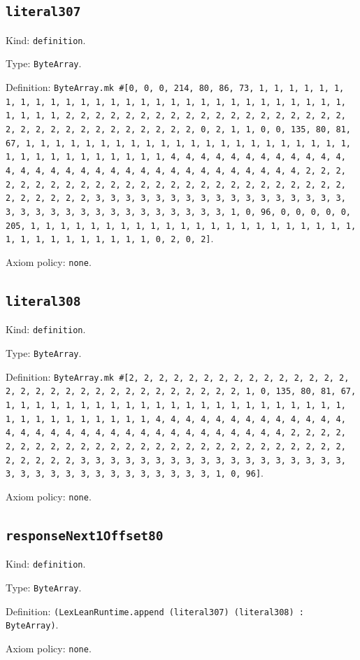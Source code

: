 \documentclass[11pt]{article}
\begin{document}
\subsection*{\texttt{literal307}}
\noindent Kind: \texttt{definition}.\par
\noindent Type: \texttt{ByteArray}.\par
\noindent Definition: \texttt{ByteArray.mk \#[0, 0, 0, 214, 80, 86, 73, 1, 1, 1, 1, 1, 1, 1, 1, 1, 1, 1, 1, 1, 1, 1, 1, 1, 1, 1, 1, 1, 1, 1, 1, 1, 1, 1, 1, 1, 1, 1, 1, 1, 2, 2, 2, 2, 2, 2, 2, 2, 2, 2, 2, 2, 2, 2, 2, 2, 2, 2, 2, 2, 2, 2, 2, 2, 2, 2, 2, 2, 2, 2, 2, 2, 0, 2, 1, 1, 0, 0, 135, 80, 81, 67, 1, 1, 1, 1, 1, 1, 1, 1, 1, 1, 1, 1, 1, 1, 1, 1, 1, 1, 1, 1, 1, 1, 1, 1, 1, 1, 1, 1, 1, 1, 1, 1, 1, 4, 4, 4, 4, 4, 4, 4, 4, 4, 4, 4, 4, 4, 4, 4, 4, 4, 4, 4, 4, 4, 4, 4, 4, 4, 4, 4, 4, 4, 4, 4, 4, 2, 2, 2, 2, 2, 2, 2, 2, 2, 2, 2, 2, 2, 2, 2, 2, 2, 2, 2, 2, 2, 2, 2, 2, 2, 2, 2, 2, 2, 2, 2, 2, 3, 3, 3, 3, 3, 3, 3, 3, 3, 3, 3, 3, 3, 3, 3, 3, 3, 3, 3, 3, 3, 3, 3, 3, 3, 3, 3, 3, 3, 3, 3, 3, 1, 0, 96, 0, 0, 0, 0, 0, 205, 1, 1, 1, 1, 1, 1, 1, 1, 1, 1, 1, 1, 1, 1, 1, 1, 1, 1, 1, 1, 1, 1, 1, 1, 1, 1, 1, 1, 1, 1, 1, 1, 0, 2, 0, 2]}.\par
\noindent Axiom policy: \texttt{none}.\par
\subsection*{\texttt{literal308}}
\noindent Kind: \texttt{definition}.\par
\noindent Type: \texttt{ByteArray}.\par
\noindent Definition: \texttt{ByteArray.mk \#[2, 2, 2, 2, 2, 2, 2, 2, 2, 2, 2, 2, 2, 2, 2, 2, 2, 2, 2, 2, 2, 2, 2, 2, 2, 2, 2, 2, 2, 2, 2, 1, 0, 135, 80, 81, 67, 1, 1, 1, 1, 1, 1, 1, 1, 1, 1, 1, 1, 1, 1, 1, 1, 1, 1, 1, 1, 1, 1, 1, 1, 1, 1, 1, 1, 1, 1, 1, 1, 1, 4, 4, 4, 4, 4, 4, 4, 4, 4, 4, 4, 4, 4, 4, 4, 4, 4, 4, 4, 4, 4, 4, 4, 4, 4, 4, 4, 4, 4, 4, 4, 4, 2, 2, 2, 2, 2, 2, 2, 2, 2, 2, 2, 2, 2, 2, 2, 2, 2, 2, 2, 2, 2, 2, 2, 2, 2, 2, 2, 2, 2, 2, 2, 2, 3, 3, 3, 3, 3, 3, 3, 3, 3, 3, 3, 3, 3, 3, 3, 3, 3, 3, 3, 3, 3, 3, 3, 3, 3, 3, 3, 3, 3, 3, 3, 3, 1, 0, 96]}.\par
\noindent Axiom policy: \texttt{none}.\par
\subsection*{\texttt{responseNext1Offset80}}
\noindent Kind: \texttt{definition}.\par
\noindent Type: \texttt{ByteArray}.\par
\noindent Definition: \texttt{(LexLeanRuntime.append (literal307) (literal308) : ByteArray)}.\par
\noindent Axiom policy: \texttt{none}.\par
\end{document}
